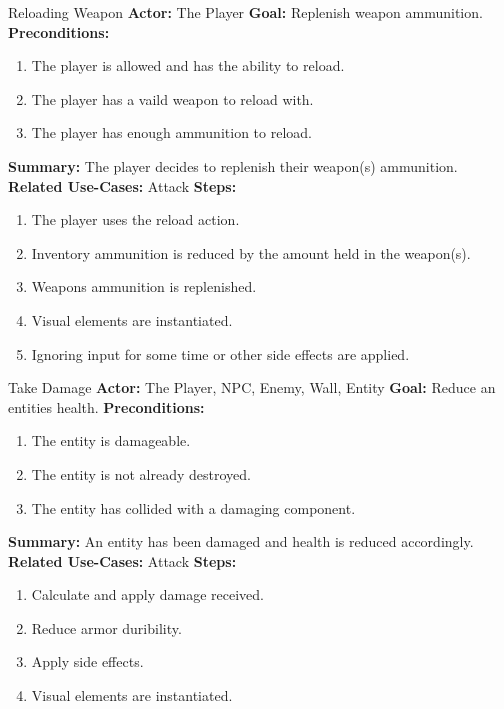 \documentclass[12pt]{report}
\begin{document}
\begin{subsection}{Reloading Weapon}
\textbf{Actor:} The Player
\textbf{Goal:} Replenish weapon ammunition.
\textbf{Preconditions:}
\begin{enumerate}
	\item The player is allowed and has the ability to reload.
	\item The player has a vaild weapon to reload with.
	\item The player has enough ammunition to reload.
\end{enumerate}
\textbf{Summary:} The player decides to replenish their weapon(s) ammunition.
\textbf{Related Use-Cases:} Attack
\textbf{Steps:}
\begin{enumerate}
	\item The player uses the reload action.
	\item Inventory ammunition is reduced by the amount held in the weapon(s).
	\item Weapons ammunition is replenished.
	\item Visual elements are instantiated.
	\item Ignoring input for some time or other side effects are applied.
\end{enumerate}
\end{subsection}

\begin{subsection}{Take Damage}
\textbf{Actor:} The Player, NPC, Enemy, Wall, Entity
\textbf{Goal:} Reduce an entities health.
\textbf{Preconditions:}
\begin{enumerate}
	\item The entity is damageable.
	\item The entity is not already destroyed.
	\item The entity has collided with a damaging component.
\end{enumerate}
\textbf{Summary:} An entity has been damaged and health is reduced accordingly.
\textbf{Related Use-Cases:} Attack
\textbf{Steps:}
\begin{enumerate}
	\item Calculate and apply damage received.
	\item Reduce armor duribility.
	\item Apply side effects.
	\item Visual elements are instantiated.
\end{enumerate}
\end{subsection}
\end{document}
